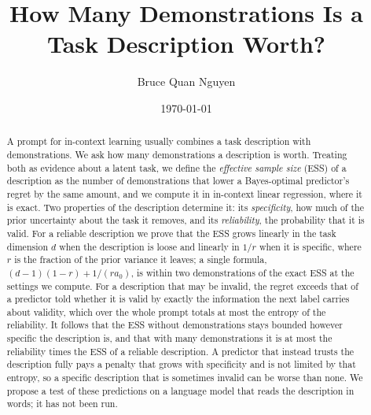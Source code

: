 \documentclass[10pt]{article}
\title{How Many Demonstrations Is a Task Description Worth?}
\author{Bruce Quan Nguyen}
\date{\today}
\begin{document}
\maketitle

\begin{abstract}
A prompt for in-context learning usually combines a task description with demonstrations. We ask how many demonstrations a description is worth. Treating both as evidence about a latent task, we define the \emph{effective sample size} (ESS) of a description as the number of demonstrations that lower a Bayes-optimal predictor's regret by the same amount, and we compute it in in-context linear regression, where it is exact. Two properties of the description determine it: its \emph{specificity}, how much of the prior uncertainty about the task it removes, and its \emph{reliability}, the probability that it is valid. For a reliable description we prove that the ESS grows linearly in the task dimension $d$ when the description is loose and linearly in $1/r$ when it is specific, where $r$ is the fraction of the prior variance it leaves; a single formula, $(d-1)(1-r) + 1/(r a_0)$, is within two demonstrations of the exact ESS at the settings we compute. For a description that may be invalid, the regret exceeds that of a predictor told whether it is valid by exactly the information the next label carries about validity, which over the whole prompt totals at most the entropy of the reliability. It follows that the ESS without demonstrations stays bounded however specific the description is, and that with many demonstrations it is at most the reliability times the ESS of a reliable description. A predictor that instead trusts the description fully pays a penalty that grows with specificity and is not limited by that entropy, so a specific description that is sometimes invalid can be worse than none. We propose a test of these predictions on a language model that reads the description in words; it has not been run.
\end{abstract}
\end{document}
